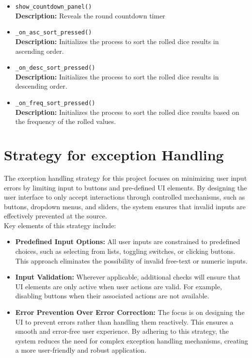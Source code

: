 \documentclass[12pt, titlepage]{article}
\begin{document}
\begin{itemize}
	\item \texttt{show\_countdown\_panel() }\\
	\textbf{Description:} Reveals the round countdown timer
	
	\item \texttt{\_on\_asc\_sort\_pressed() }\\
	\textbf{Description:} Initializes the process to sort the rolled dice results in ascending order.
	
	\item \texttt{\_on\_desc\_sort\_pressed() }\\
	\textbf{Description:} Initializes the process to sort the rolled dice results in descending order.
	
	\item \texttt{\_on\_freq\_sort\_pressed() }\\
	\textbf{Description:} Initializes the process to sort the rolled dice results based on the frequency of the rolled values.
	
	
\end{itemize}

\newpage

\section{Strategy for exception Handling} 

The exception handling strategy for this project focuses on minimizing user input errors by limiting input to buttons and pre-defined UI elements. By designing the user interface to only accept interactions through controlled mechanisms, such as buttons, dropdown menus, and sliders, the system ensures that invalid inputs are effectively prevented at the source.\\

Key elements of this strategy include:

\begin{itemize}
    \item \textbf{Predefined Input Options: }All user inputs are constrained to predefined choices, such as selecting from lists, toggling switches, or clicking buttons. This approach eliminates the possibility of invalid free-text or numeric inputs.
    \item \textbf{Input Validation: }Wherever applicable, additional checks will ensure that UI elements are only active when user actions are valid. For example, disabling buttons when their associated actions are not available.
    \item \textbf{Error Prevention Over Error Correction: }The focus is on designing the UI to prevent errors rather than handling them reactively. This ensures a smooth and error-free user experience.
By adhering to this strategy, the system reduces the need for complex exception handling mechanisms, creating a more user-friendly and robust application.

\end{itemize}
\end{document}
